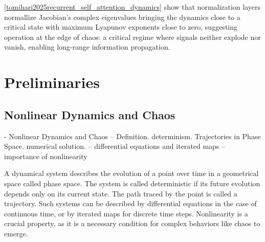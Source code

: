 \documentclass[a4paper,12pt]{article}
\begin{document}
\ref{tomihari2025recurrent_self_attention_dynamics} show that normalization layers normallize Jacobian's complex eigenvalues bringing the dynamics close to a critical state with maximum Lyapunov exponents close to zero, suggesting operation at the edge of chaos: a critical regime where signals neither explode nor vanish, enabling long-range information propagation.






\section{Preliminaries}


\subsection{Nonlinear Dynamics and Chaos}

- Nonlinear Dynamics and Chaos
-- Definition. determinism. Trajectories in Phase Space. numerical solution.
-- differential equations and iterated maps
-- importance of nonlinearity

A dynamical system describes the evolution of a point over time in a geometrical space called phase space. The system is called deterministic if its future evolution depends only on its current state. The path traced by the point is called a trajectory. Such systems can be described by differential equations in the case of continuous time, or by iterated maps for discrete time steps. Nonlinearity is a crucial property, as it is a necessary condition for complex behaviors like chaos to emerge.
\end{document}
